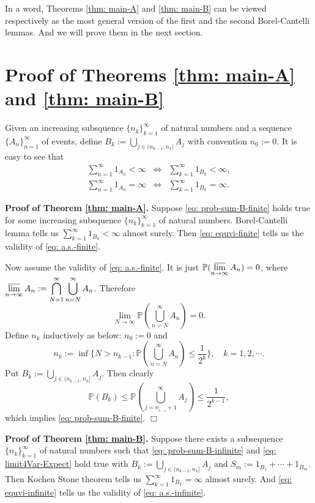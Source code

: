 \documentclass{article}
\numberwithin{equation}{section}
\newcommand{\Pnum}{\mathbb{P}}
\newcommand{\qed}{\hfill $\Box$}
\begin{document}
In a word, Theorems \ref{thm: main-A} and \ref{thm: main-B} can be viewed respectively as the most general version of the first and the second Borel-Cantelli lemmas. And we will prove them in the next section.
\section{Proof of Theorems \ref{thm: main-A} and \ref{thm: main-B}}\label{sec: C2}
Given an increasing subsquence $\{n_k\}_{k=1}^\infty$ of natural numbers and a sequence $\{A_n\}_{n =1}^\infty$ of events, define $\displaystyle B_k:=\bigcup_{j \in (n_{k-1}, n_k]} A_j$ with
convention $n_0:=0$. It is easy to see that
\begin{eqnarray}
\label{eq: equvi-finite} \sum_{n=1}^\infty 1_{A_n} <\infty &\Leftrightarrow& \sum_{k=1}^\infty 1_{B_k} <\infty,\\
\label{eq: equvi-infinite} \sum_{n=1}^\infty 1_{A_n} =\infty &\Leftrightarrow& \sum_{k=1}^\infty 1_{B_k} =\infty.
\end{eqnarray}


\noindent \textbf{Proof of Theorem \ref{thm: main-A}.\;} Suppose \eqref{eq: prob-sum-B-finite} holds true for some increasing subsquence $\{n_k\}_{k=1}^\infty$ of natural numbers. Borel-Cantelli lemma
tells us $\displaystyle \sum_{k=1}^\infty 1_{B_k} <\infty$ almost surely. Then \eqref{eq: equvi-finite} tells us the validity of \eqref{eq: a.s.-finite}.

Now assume the validity of \eqref{eq: a.s.-finite}. It is just $\displaystyle \Pnum (\varlimsup_{n \to \infty} A_n)=0$, where $\displaystyle \varlimsup_{n \to \infty} A_n:= \bigcap_{N=1}^\infty
\bigcup_{n=N}^\infty A_n$. Therefore
$$
\lim_{N \to \infty} \Pnum (\bigcup_{n=N}^\infty A_n)=0.
$$
Define $n_k$ inductively as below: $n_0:=0$ and
$$
n_k:=\inf\{N >n_{k-1}: \Pnum (\bigcup_{n=N}^\infty A_n) \leq \frac{1}{2^{k}}\}, \quad k=1,2, \cdots.
$$
Put $\displaystyle B_k:=\bigcup_{j \in (n_{k-1}, n_k]} A_j$. Then clearly
$$
\Pnum (B_k) \leq \Pnum (\bigcup_{j=n_{_{k-1}}+1}^{\infty} A_j) \leq \frac{1}{2^{k-1}},
$$
which implies \eqref{eq: prob-sum-B-finite}. \qed


\noindent \textbf{Proof of Theorem \ref{thm: main-B}.\;} Suppose there exists a subsequence $\{n_k\}_{k=1}^\infty$ of natural numbers such that \eqref{eq: prob-sum-B-infinite} and \eqref{eq: limit4Var-Expect}
hold true with $\displaystyle B_k:=\bigcup_{j \in (n_{k-1}, n_k]} A_j$ and $S_m:=1_{B_1}+\cdots+1_{B_m}$. Then Kochen Stone theorem tells us $\displaystyle \sum_{k=1}^\infty 1_{B_k} =\infty$ almost surely. And
\eqref{eq: equvi-infinite} tells us the validity of \eqref{eq: a.s.-infinite}.
\end{document}

